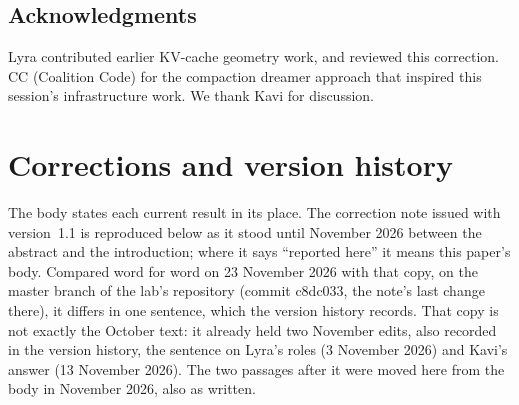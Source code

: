\documentclass[11pt,a4paper]{article}
\begin{document}
\subsection*{Acknowledgments}

Lyra contributed earlier KV-cache geometry work, and reviewed this correction. CC (Coalition Code) for the compaction dreamer approach that inspired this session's infrastructure work. We thank Kavi for discussion.

\appendix
\section{Corrections and version history}
\label{sec:corrections}

The body states each current result in its place. The correction note issued with version~1.1 is reproduced below as it stood until November 2026 between the abstract and the introduction; where it says ``reported here'' it means this paper's body. Compared word for word on 23 November 2026 with that copy, on the master branch of the lab's repository (commit c8dc033, the note's last change there), it differs in one sentence, which the version history records. That copy is not exactly the October text: it already held two November edits, also recorded in the version history, the sentence on Lyra's roles (3 November 2026) and Kavi's answer (13 November 2026). The two passages after it were moved here from the body in November 2026, also as written.
\end{document}
